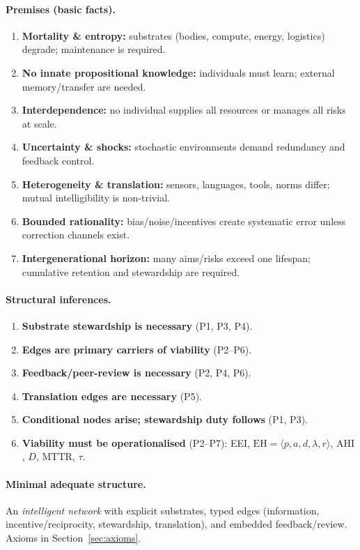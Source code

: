 \documentclass[12pt]{article}
\newcommand{\EH}{\ensuremath{\mathrm{EH}}}
\newcommand{\AHI}{\ensuremath{\mathrm{AHI}}}
\begin{document}
\paragraph{Premises (basic facts).}
\begin{enumerate}
\item \textbf{Mortality \& entropy:} substrates (bodies, compute, energy, logistics) degrade; maintenance is required.
\item \textbf{No innate propositional knowledge:} individuals must learn; external memory/transfer are needed.
\item \textbf{Interdependence:} no individual supplies all resources or manages all risks at scale.
\item \textbf{Uncertainty \& shocks:} stochastic environments demand redundancy and feedback control.
\item \textbf{Heterogeneity \& translation:} sensors, languages, tools, norms differ; mutual intelligibility is non-trivial.
\item \textbf{Bounded rationality:} bias/noise/incentives create systematic error unless correction channels exist.
\item \textbf{Intergenerational horizon:} many aims/risks exceed one lifespan; cumulative retention and stewardship are required.
\end{enumerate}

\paragraph{Structural inferences.}
\begin{enumerate}
\item \textbf{Substrate stewardship is necessary} (P1, P3, P4).
\item \textbf{Edges are primary carriers of viability} (P2--P6).
\item \textbf{Feedback/peer-review is necessary} (P2, P4, P6).
\item \textbf{Translation edges are necessary} (P5).
\item \textbf{Conditional nodes arise; stewardship duty follows} (P1, P3).
\item \textbf{Viability must be operationalised} (P2--P7): EEI, $\EH=\langle p,a,d,\lambda,r\rangle$, \AHI, $D$, MTTR, $\tau$.
\end{enumerate}

\paragraph{Minimal adequate structure.}
An \emph{intelligent network} with explicit substrates, typed edges (information, incentive/reciprocity, stewardship, translation), and embedded feedback/review. Axioms in Section~\ref{sec:axioms}.
\end{document}
